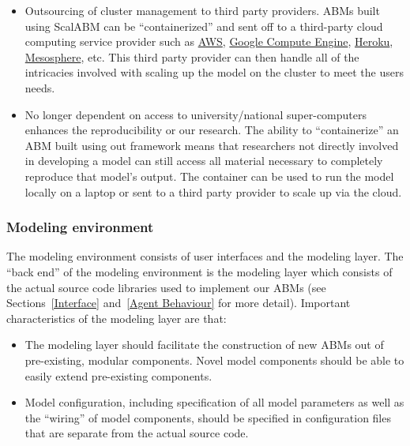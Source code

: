 \documentclass[a4paper]{article}
\begin{document}
\begin{itemize}
    \item Outsourcing of cluster management to third party providers. ABMs built using ScalABM can be ``containerized'' and sent off to a third-party cloud computing service provider such as \href{http://aws.amazon.com/}{AWS}, \href{https://cloud.google.com/compute/}{Google Compute Engine}, \href{https://www.heroku.com/}{Heroku}, \href{https://mesosphere.com/}{Mesosphere}, etc. This third party provider can then handle all of the intricacies involved with scaling up the model on the cluster to meet the users needs.
    \item No longer dependent on access to university/national super-computers enhances the reproducibility or our research.  The ability to ``containerize'' an ABM built using out framework means that researchers not directly involved in developing a model can still access all material necessary to completely reproduce that model's output. The container can be used to run the model locally on a laptop or sent to a third party provider to scale up via the cloud. 
\end{itemize}

\subsubsection{Modeling environment}
The modeling environment consists of user interfaces and the modeling layer. The ``back end'' of the modeling environment is the modeling layer which consists of the actual source code libraries used to implement our ABMs (see Sections~\ref{Interface} and~\ref{Agent Behaviour} for more detail). Important characteristics of the modeling layer are that:  

\begin{itemize}
    \item The modeling layer should facilitate the construction of new ABMs out of pre-existing, modular components. Novel model components should be able to easily extend pre-existing components. 
    \item Model configuration, including specification of all model parameters as well as the ``wiring'' of model components, should be specified in configuration files that are separate from the actual source code.
\end{itemize}
\end{document}
